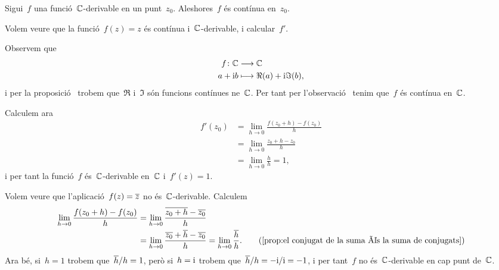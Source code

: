 \documentclass[../Apunts.tex]{subfiles}
\begin{document}
    \begin{observation}
        \label{obs:C-derivable implica contínua}
        Sigui~\(f\) una funció~\(\mathbb{C}\)-derivable en un punt~\(z_{0}\).
        Aleshores~\(f\) és contínua en~\(z_{0}\).
    \end{observation}
    \begin{example}
        \label{ex:la funció identitat és entera}
        Volem veure que la funció~\(f(z)=z\) és contínua i~\(\mathbb{C}\)-derivable,
        i calcular~\(f'\).
    \end{example}
    \begin{solution}
        Observem que
        \begin{align*}
            f\colon\mathbb{C}&\longrightarrow\mathbb{C} \\
            a+\mathrm{i} b&\longmapsto \Re(a)+\mathrm{i}\Im(b),
        \end{align*}
        i per la proposició~ trobem que~\(\Re\) i~\(\Im\) són
        funcions contínues ne~\(\mathbb{C}\).
        Per tant per l'observació~ tenim que~\(f\) és contínua
        en~\(\mathbb{C}\).
        
        Calculem ara
        \begin{align*}
            f'(z_{0})&=\lim_{h\to0}\frac{f(z_{0}+h)-f(z_{0})}{h} \\
            &=\lim_{h\to0}\frac{z_{0}+h-z_{0}}{h} \\
            &=\lim_{h\to0}\frac{h}{h}=1,
        \end{align*}
        i per tant la funció~\(f\) és~\(\mathbb{C}\)-derivable en~\(\mathbb{C}\) i~\(f'(z)=1\).
    \end{solution}
    \begin{example}
        Volem veure que l'aplicació~\(f(z)=\overline{z}\) no és~\(\mathbb{C}\)-derivable.
        Calculem
        \begin{align*}
            \lim_{h\to0}\frac{f(z_{0}+h)-f(z_{0})}{h}
            &=\lim_{h\to0}\frac{\conjugat{z_{0}+h}-\conjugat{z_{0}}}{h} \\
            &=\lim_{h\to0}\frac{\conjugat{z_{0}}+\conjugat{h}-\conjugat{z_{0}}}{h}
            =\lim_{h\to0}\frac{\conjugat{h}}{h}.
            \tag{\ref{prop:el conjugat de la suma és la suma de conjugats}}
        \end{align*}
        Ara bé, si~\(h=1\) trobem que~\(\overline{h}/h=1\), però si~\(h=\mathrm{i}\)
        trobem que~\(\overline{h}/h=-\mathrm{i}/\mathrm{i}=-1\), i per tant~\(f\)
        no és~\(\mathbb{C}\)-derivable en cap punt de~\(\mathbb{C}\).
    \end{example}
\end{document}
